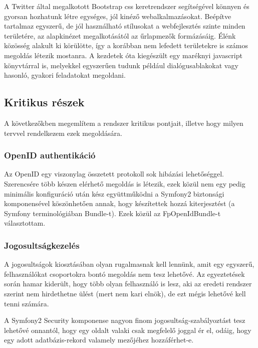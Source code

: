\documentclass[a4paper,12pt,oneside]{report}
\begin{document}
A Twitter által megalkotott Bootstrap\cite{website:bootstrap} css keretrendszer segítségével könnyen és gyorsan hozhatunk létre egységes, jól kinéző webalkalmazásokat. Beépítve tartalmaz egyszerű, de jól használható stílusokat a webfejlesztés szinte minden területére, az alapkinézet megalkotásától az űrlapmezők formázásáig. Élénk közösség alakult ki körülötte, így a korábban nem lefedett területekre is számos megoldás létezik mostanra. A kezdetek óta kiegészült egy maréknyi javascript könyvtárral is, melyekkel egyszerűen tudunk például dialógusablakokat vagy hasonló, gyakori feladatokat megoldani.

\subsection{Kritikus részek}

A következőkben megemlítem a rendszer kritikus pontjait, illetve hogy milyen tervvel rendelkezem ezek megoldására.

\subsubsection{OpenID authentikáció}

Az OpenID\cite{website:openid_specifikacio} egy viszonylag összetett protokoll sok hibázási lehetőséggel. Szerencsére több készen elérhető megoldás is létezik, ezek közül nem egy pedig minimális konfiguráció után kész együttműködni a Symfony2 biztonsági komponensével köszönhetően annak, hogy készítettek hozzá kiterjesztést (a Symfony terminológiában Bundle-t). Ezek közül az FpOpenIdBundle\cite{website:fpopenidbundle}-t választottam.

\subsubsection{Jogosultságkezelés}

A jogosultságok kiosztásában olyan rugalmasnak kell lennünk, amit egy egyszerű, felhasználókat csoportokra bontó megoldás nem tesz lehetővé. Az egyeztetések során hamar kiderült, hogy több olyan felhasználó is lesz, aki az eredeti rendszer szerint nem hirdethetne ülést (mert nem kari elnök), de ezt mégis lehetővé kell tenni számára.

A Symfony2 Security komponense nagyon finom jogosultság-szabályoztást tesz lehetővé onnantól, hogy egy oldalt valaki csak megfelelő joggal ér el, odáig, hogy egy adott adatbázis-rekord valamely mezőjéhez hozzáférhet-e.
\end{document}
